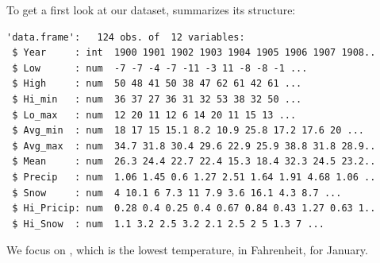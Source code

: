 \begin{frame}[fragile]

To get a first look at our dataset,  summarizes its structure:

\begin{knitrout}\small
{}\color{fgcolor}\begin{kframe}
\begin{alltt}
\end{alltt}
\begin{verbatim}
'data.frame':	124 obs. of  12 variables:
 $ Year     : int  1900 1901 1902 1903 1904 1905 1906 1907 1908..
 $ Low      : num  -7 -7 -4 -7 -11 -3 11 -8 -8 -1 ...
 $ High     : num  50 48 41 50 38 47 62 61 42 61 ...
 $ Hi_min   : num  36 37 27 36 31 32 53 38 32 50 ...
 $ Lo_max   : num  12 20 11 12 6 14 20 11 15 13 ...
 $ Avg_min  : num  18 17 15 15.1 8.2 10.9 25.8 17.2 17.6 20 ...
 $ Avg_max  : num  34.7 31.8 30.4 29.6 22.9 25.9 38.8 31.8 28.9..
 $ Mean     : num  26.3 24.4 22.7 22.4 15.3 18.4 32.3 24.5 23.2..
 $ Precip   : num  1.06 1.45 0.6 1.27 2.51 1.64 1.91 4.68 1.06 ..
 $ Snow     : num  4 10.1 6 7.3 11 7.9 3.6 16.1 4.3 8.7 ...
 $ Hi_Pricip: num  0.28 0.4 0.25 0.4 0.67 0.84 0.43 1.27 0.63 1..
 $ Hi_Snow  : num  1.1 3.2 2.5 3.2 2.1 2.5 2 5 1.3 7 ...
\end{verbatim}
\end{kframe}
\end{knitrout}

We focus on , which is the lowest temperature, in Fahrenheit, for January.

\end{frame}

